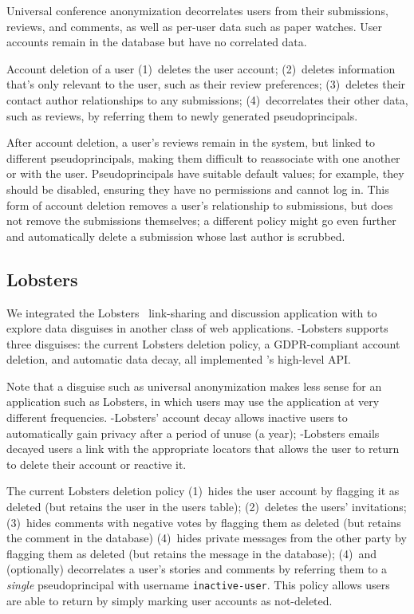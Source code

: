 Universal conference anonymization decorrelates users from their submissions, reviews, and comments,
as well as per-user data such as paper watches. User accounts remain in the database but have no
correlated data.

 Account deletion of a user 
%
(1)~deletes the user account;
%
(2)~deletes information that's only relevant to the user, such as their review preferences;
%
(3)~deletes their contact author relationships to any submissions;
%
(4)~decorrelates their other data, such as reviews, by referring them to newly generated
pseudoprincipals.

After account deletion, a user's reviews remain in the system, but linked to different
pseudoprincipals, making them difficult to reassociate with one another or with the user.
%
Pseudoprincipals have suitable default values; for example, they should be disabled, ensuring they
have no permissions and cannot log in.
%
This form of account deletion removes a user's relationship to submissions, but does not remove the
submissions themselves; a different policy might go even further and automatically delete a
submission whose last author is scrubbed.


\subsection{Lobsters} 
We integrated the Lobsters~\cite{lobsters} link-sharing and discussion application with \sys to
explore data disguises in another class of web applications. \sys-Lobsters supports three disguises:
the current Lobsters deletion policy, a GDPR-compliant account deletion, and automatic
data decay, all implemented \sys's high-level API. 

Note that a disguise such as universal anonymization makes less sense for an application such as
Lobsters, in which users may use the application at very different frequencies.  \sys-Lobsters'
account decay allows inactive users to automatically gain privacy after a period of unuse (\eg a
year); \sys-Lobsters emails decayed users a link with the appropriate locators that allows the user
to return to delete their account or reactive it. 

The current Lobsters deletion policy
%
(1)~hides the user account by flagging it as deleted (but retains the user in the users table);
%
(2)~deletes the users' invitations;
%
(3)~hides comments with negative votes by flagging them as deleted (but retains the comment in the database)
%
(4)~hides private messages from the other party by flagging them as deleted (but retains the message
in the database);
%
(4)~and (optionally) decorrelates a user's stories and comments by referring them
to a \emph{single} pseudoprincipal with username \texttt{inactive-user}.
%
This policy allows users are able to return by simply marking user accounts as not-deleted.

